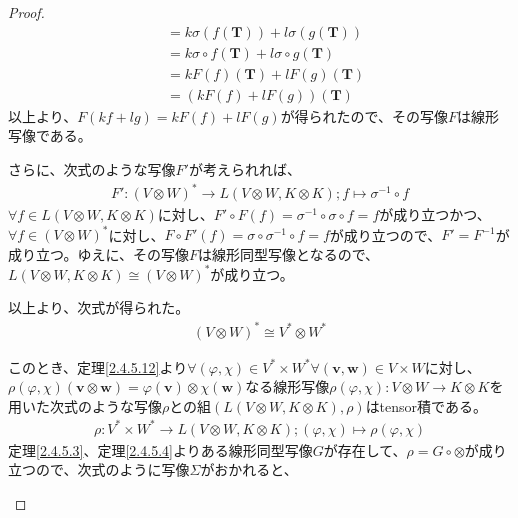 \documentclass[dvipdfmx]{jsarticle}
\begin{document}
\begin{proof}
\begin{align*}
&= k\sigma\left( f\left( \mathbf{T} \right) \right) + l\sigma\left( g\left( \mathbf{T} \right) \right)\\
&= k\sigma \circ f\left( \mathbf{T} \right) + l\sigma \circ g\left( \mathbf{T} \right)\\
&= kF(f)\left( \mathbf{T} \right) + lF(g)\left( \mathbf{T} \right)\\
&= \left( kF(f) + lF(g) \right)\left( \mathbf{T} \right)
\end{align*}
以上より、$F(kf + lg) = kF(f) + lF(g)$が得られたので、その写像$F$は線形写像である。\par
さらに、次式のような写像$F'$が考えられれば、
\begin{align*}
F':(V \otimes W)^{*} \rightarrow L(V \otimes W,K \otimes K);f \mapsto \sigma^{- 1} \circ f
\end{align*}
$\forall f \in L(V \otimes W,K \otimes K)$に対し、$F' \circ F(f) = \sigma^{- 1} \circ \sigma \circ f = f$が成り立つかつ、$\forall f \in (V \otimes W)^{*}$に対し、$F \circ F'(f) = \sigma \circ \sigma^{- 1} \circ f = f$が成り立つので、$F' = F^{- 1}$が成り立つ。ゆえに、その写像$F$は線形同型写像となるので、$L(V \otimes W,K \otimes K) \cong (V \otimes W)^{*}$が成り立つ。\par
以上より、次式が得られた。
\begin{align*}
(V \otimes W)^{*} \cong V^{*} \otimes W^{*}
\end{align*}\par
このとき、定理\ref{2.4.5.12}より$\forall(\varphi,\chi) \in V^{*} \times W^{*}\forall\left( \mathbf{v},\mathbf{w} \right) \in V \times W$に対し、$\rho(\varphi,\chi)\left( \mathbf{v} \otimes \mathbf{w} \right) = \varphi\left( \mathbf{v} \right) \otimes \chi\left( \mathbf{w} \right)$なる線形写像$\rho(\varphi,\chi):V \otimes W \rightarrow K \otimes K$を用いた次式のような写像$\rho$との組$\left( L(V \otimes W,K \otimes K),\rho \right)$はtensor積である。
\begin{align*}
\rho:V^{*} \times W^{*} \rightarrow L(V \otimes W,K \otimes K);(\varphi,\chi) \mapsto \rho(\varphi,\chi)
\end{align*}
定理\ref{2.4.5.3}、定理\ref{2.4.5.4}よりある線形同型写像$G$が存在して、$\rho = G \circ \otimes$が成り立つので、次式のように写像$\varSigma$がおかれると、
\begin{center}
\end{center}
\end{proof}
\end{document}
